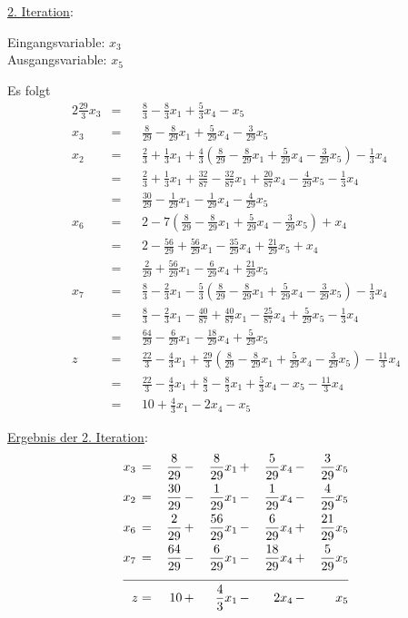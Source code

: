 \documentclass[10pt,a4paper,oneside,ngerman,numbers=noenddot]{scrartcl}
\begin{document}
		\underline{2. Iteration}:
		
		Eingangsvariable: $x_{3}$ \\
		Ausgangsvariable: $x_{5}$
		
		Es folgt
		\begin{alignat*}{2}
			\frac{29}{3}x_{3} &=&& \frac{8}{3} - \frac{8}{3}x_{1} + \frac{5}{3}x_{4} - x_{5} \\
			x_{3} &=&& \frac{8}{29} - \frac{8}{29}x_{1} + \frac{5}{29}x_{4} - \frac{3}{29}x_{5} \\
			x_{2} &=&& \frac{2}{3} + \frac{1}{3}x_{1} + \frac{4}{3}\left(\frac{8}{29} - \frac{8}{29}x_{1} + \frac{5}{29}x_{4} - \frac{3}{29}x_{5}\right) - \frac{1}{3}x_{4} \\
			&=&& \frac{2}{3} + \frac{1}{3}x_{1} + \frac{32}{87} - \frac{32}{87}x_{1} + \frac{20}{87}x_{4} - \frac{4}{29}x_{5} - \frac{1}{3}x_{4} \\
			&=&& \frac{30}{29} - \frac{1}{29}x_{1} - \frac{1}{29}x_{4} - \frac{4}{29}x_{5} \\
			x_{6} &=&& 2 - 7\left(\frac{8}{29} - \frac{8}{29}x_{1} + \frac{5}{29}x_{4} - \frac{3}{29}x_{5}\right) + x_{4} \\
			&=&& 2 - \frac{56}{29} + \frac{56}{29}x_{1} - \frac{35}{29}x_{4} + \frac{21}{29}x_{5} + x_{4} \\
			&=&& \frac{2}{29} + \frac{56}{29}x_{1} - \frac{6}{29}x_{4} + \frac{21}{29}x_{5} \\
			x_{7} &=&& \frac{8}{3} - \frac{2}{3}x_{1} - \frac{5}{3}\left(\frac{8}{29} - \frac{8}{29}x_{1} + \frac{5}{29}x_{4} - \frac{3}{29}x_{5}\right) - \frac{1}{3}x_{4} \\
			&=&& \frac{8}{3} - \frac{2}{3}x_{1} - \frac{40}{87} + \frac{40}{87}x_{1} - \frac{25}{87}x_{4} + \frac{5}{29}x_{5} - \frac{1}{3}x_{4} \\
			&=&& \frac{64}{29} - \frac{6}{29}x_{1} - \frac{18}{29}x_{4} + \frac{5}{29}x_{5} \\
			z &=&& \frac{22}{3} - \frac{4}{3}x_{1} + \frac{29}{3}\left(\frac{8}{29} - \frac{8}{29}x_{1} + \frac{5}{29}x_{4} - \frac{3}{29}x_{5}\right) - \frac{11}{3}x_{4} \\
			&=&& \frac{22}{3} - \frac{4}{3}x_{1} + \frac{8}{3} - \frac{8}{3}x_{1} + \frac{5}{3}x_{4} - x_{5} - \frac{11}{3}x_{4} \\
			&=&& 10 + \frac{4}{3}x_{1} - 2x_{4} - x_{5}
		\end{alignat*}
		
		\underline{Ergebnis der 2. Iteration}:
		\begin{alignat*}{5}
			x_{3} \,&=&\, \frac{8}{29} \,&-&\, \frac{8}{29}x_{1} \,&+&\, \frac{5}{29}x_{4} \,&-&\, \frac{3}{29}x_{5} \\
			x_{2} \,&=&\, \frac{30}{29} \,&-&\, \frac{1}{29}x_{1} \,&-&\, \frac{1}{29}x_{4} \,&-&\, \frac{4}{29}x_{5} \\
			x_{6} \,&=&\, \frac{2}{29} \,&+&\, \frac{56}{29}x_{1} \,&-&\, \frac{6}{29}x_{4} \,&+&\, \frac{21}{29}x_{5} \\
			x_{7} \,&=&\, \frac{64}{29} \,&-&\, \frac{6}{29}x_{1} \,&-&\, \frac{18}{29}x_{4} \,&+&\, \frac{5}{29}x_{5} \\ \cline{1 - 9}
			z &=& 10 \,&+&\, \frac{4}{3}x_{1} \,&-&\, 2x_{4} \,&-&\, x_{5}
		\end{alignat*}
		
\end{document}
